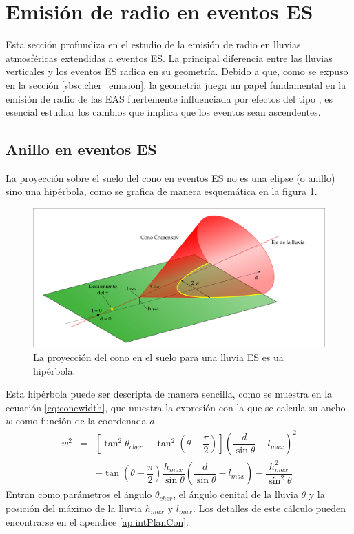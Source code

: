 \section{Emisi\'on de radio en eventos ES}
\label{sc:toymodel}
	
	Esta secci\'on profundiza en el estudio de la emisi\'on de radio en lluvias atmosf\'ericas extendidas a eventos ES. 
	La principal diferencia entre las lluvias verticales y los eventos ES radica en su geometr\'ia.
	Debido a que, como se expuso en la secci\'on \ref{sbsc:cher_emision}, la geometr\'ia juega un papel fundamental en la emisi\'on de radio de las EAS fuertemente influenciada por efectos del tipo \cher{}, es esencial estudiar los cambios que implica que los eventos sean ascendentes.
	
	\subsection{Anillo \cher{} en eventos ES}
	\label{sbsc:conoEs}
	
	La proyección sobre el suelo del cono \cher{} en eventos ES no es una elipse (o anillo) sino una hipérbola, como se grafica de manera esquem\'atica en la figura \ref{fig:chConeES}.
	\begin{figure}[ht!]
	\centering
		\includegraphics[width=\textwidth]{fig/EASRadio/coneProy}
		\caption{\label{fig:chConeES} La proyección del cono en el suelo para una lluvia ES es ua hip\'erbola.}
	\end{figure}
	Esta hip\'erbola puede ser descripta de manera sencilla, como se muestra en la ecuación \ref{eq:conewidth}, que muestra la expresión con la que se calcula su ancho $w$ como función de la coordenada $d$.
	\begin{equation}
	\renewcommand{\arraystretch}{2.5}
	\begin{array}{rcl}
	w^2&=& \left[\tan^2 \theta_{cher}-\tan^2 \left(\theta-\dfrac{\pi}{2}\right)\right]
	\left(\dfrac{d}{\sin \theta}-l_{max}\right)^2\\
	& & - \tan \left(\theta-\dfrac{\pi}{2}\right) \dfrac{h_{max}}{\sin \theta}
	\left(\dfrac{d}{\sin \theta}-l_{max}\right)
	- \dfrac{h_{max}^2}{\sin^2 \theta}
	\end{array}
	\label{eq:conewidth}
	\end{equation}
	Entran como parámetros el ángulo \cher{} $\theta_{cher}$, el ángulo cenital de la lluvia $\theta$ y la posición del máximo de la lluvia $h_{max}$ y $l_{max}$.
	Los detalles de este cálculo pueden encontrarse en el apendice \ref{ap:intPlanCon}.
	
